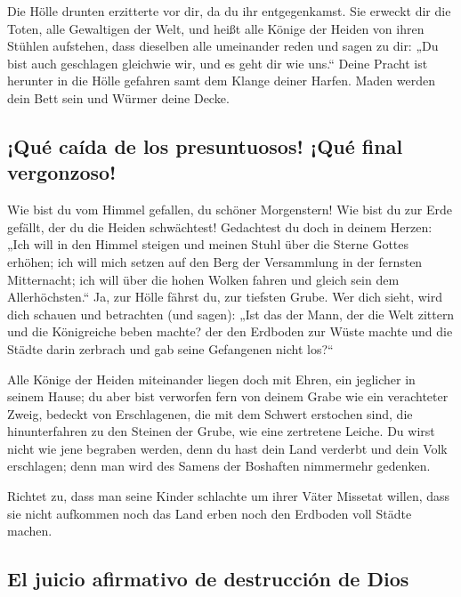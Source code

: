  Die Hölle drunten erzitterte vor dir, da du ihr
entgegenkamst. Sie erweckt dir die Toten, alle Gewaltigen der Welt, und
heißt alle Könige der Heiden von ihren Stühlen aufstehen,
 dass dieselben alle umeinander reden und sagen zu dir:
„Du bist auch geschlagen gleichwie wir, und es geht dir wie uns.``
 Deine Pracht ist herunter in die Hölle gefahren samt dem
Klange deiner Harfen. Maden werden dein Bett sein und Würmer deine
Decke.

\hypertarget{quuxe9-cauxedda-de-los-presuntuosos-quuxe9-final-vergonzoso}{%
\subsection{¡Qué caída de los presuntuosos! ¡Qué final
vergonzoso!}\label{quuxe9-cauxedda-de-los-presuntuosos-quuxe9-final-vergonzoso}}

 Wie bist du vom Himmel gefallen, du schöner Morgenstern!
Wie bist du zur Erde gefällt, der du die Heiden schwächtest!
 Gedachtest du doch in deinem Herzen: „Ich will in den
Himmel steigen und meinen Stuhl über die Sterne Gottes erhöhen;
 ich will mich setzen auf den Berg der Versammlung in der
fernsten Mitternacht; ich will über die hohen Wolken fahren und gleich
sein dem Allerhöchsten.``  Ja, zur Hölle fährst du, zur
tiefsten Grube.  Wer dich sieht, wird dich schauen und
betrachten (und sagen): „Ist das der Mann, der die Welt zittern und die
Königreiche beben machte?  der den Erdboden zur Wüste
machte und die Städte darin zerbrach und gab seine Gefangenen nicht
los?{}``

 Alle Könige der Heiden miteinander liegen doch mit
Ehren, ein jeglicher in seinem Hause;  du aber bist
verworfen fern von deinem Grabe wie ein verachteter Zweig, bedeckt von
Erschlagenen, die mit dem Schwert erstochen sind, die hinunterfahren zu
den Steinen der Grube, wie eine zertretene Leiche.  Du
wirst nicht wie jene begraben werden, denn du hast dein Land verderbt
und dein Volk erschlagen; denn man wird des Samens der Boshaften
nimmermehr gedenken.

 Richtet zu, dass man seine Kinder schlachte um ihrer
Väter Missetat willen, dass sie nicht aufkommen noch das Land erben noch
den Erdboden voll Städte machen.

\hypertarget{el-juicio-afirmativo-de-destrucciuxf3n-de-dios}{%
\subsection{El juicio afirmativo de destrucción de
Dios}\label{el-juicio-afirmativo-de-destrucciuxf3n-de-dios}}

